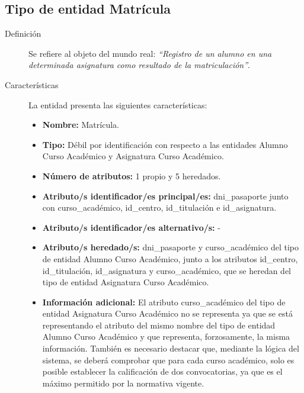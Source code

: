 \subsection{Tipo de entidad Matrícula}

   \begin{description}

   \item[Definición] Se refiere al objeto del mundo real: \emph{``Registro de un
   alumno en una determinada asignatura como resultado de la matriculación''}.

   \item[Características] La entidad presenta las siguientes características:
      \begin{itemize}
         \item \textbf{Nombre:} Matrícula.
         \item \textbf{Tipo:} Débil por identificación con respecto a las
         entidades Alumno Curso Académico y Asignatura Curso Académico.
         \item \textbf{Número de atributos:} 1 propio y 5 heredados.
         \item \textbf{Atributo/s identificador/es principal/es:} dni\_pasaporte
         junto con curso\_académico, id\_centro, id\_titulación e id\_asignatura.
         \item \textbf{Atributo/s identificador/es alternativo/s:} -
         \item \textbf{Atributo/s heredado/s:} dni\_pasaporte y curso\_académico
         del tipo de entidad Alumno Curso Académico, junto a los atributos id\_centro,
         id\_titulación, id\_asignatura y curso\_académico, que se heredan del
         tipo de entidad Asignatura Curso Académico.
         \item \textbf{Información adicional:} El atributo curso\_académico del
         tipo de entidad Asignatura Curso Académico no se representa ya que se
         está representando el atributo del mismo nombre del tipo de entidad
         Alumno Curso Académico y que representa, forzosamente, la misma
         información. También es necesario destacar que, mediante la lógica del
         sistema, se deberá comprobar que para cada curso académico, solo es
         posible establecer la calificación de dos convocatorias, ya que es el
         máximo permitido por la normativa vigente.
      \end{itemize}


\end{description}
